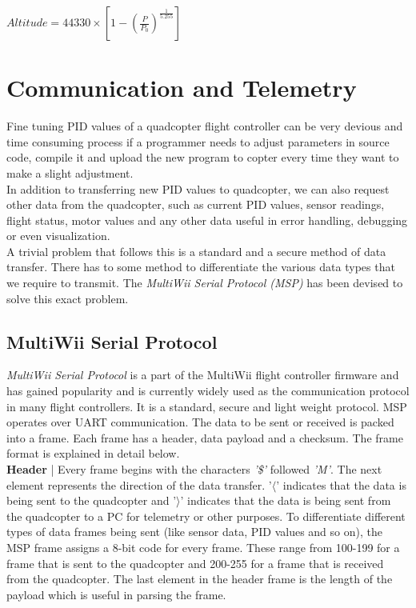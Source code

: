 \documentclass[a4paper,12pt,oneside]{book}
\begin{document}
\begin{minipage}{\textwidth}
\centering
$Altitude = 44330 \times \left [1 - \left (\frac{P}{P_{0}}\right )^{\frac{1}{5.255}} \right ]$
\end{minipage}
\clearpage

\section{Communication and Telemetry}
\label{sec:comm}
Fine tuning PID values of a quadcopter flight controller can be very devious and time consuming process if a programmer needs to adjust parameters in source code, compile it and upload the new program to copter every time they want to make a slight adjustment.\\ 

In addition to transferring new PID values to quadcopter, we can also request other data from the quadcopter, such as current PID values, sensor readings, flight status, motor values and any other data useful in error handling, debugging or even visualization.\\

A trivial problem that follows this is a standard and a secure method of data transfer. There has to some method to differentiate the various data types that we require to transmit. The \textit{MultiWii Serial Protocol (MSP)} has been devised to solve this exact problem.\\

\subsection{MultiWii Serial Protocol}
\textit{MultiWii Serial Protocol} is a part of the MultiWii flight controller firmware and has gained popularity and is currently widely used as the communication protocol in many flight controllers. It is a standard, secure and light weight protocol. MSP operates over UART communication. The data to be sent or received is packed into a frame. Each frame has a header, data payload and a checksum. The frame format is explained in detail below.\\

\textbf{Header} | Every frame begins with the characters \textit{'\$'} followed \textit{'M'}. The next element represents the direction of the data transfer. '$\langle$' indicates that the data is being sent to the quadcopter and '$\rangle$' indicates that the data is being sent from the quadcopter to a PC for telemetry or other purposes. To differentiate different types of data frames being sent (like sensor data, PID values and so on), the MSP frame assigns a 8-bit code for every frame. These range from 100-199 for a frame that is sent to the quadcopter and 200-255 for a frame that is received from the quadcopter. The last element in the header frame is the length of the payload which is useful in parsing the frame.\\
\end{document}
